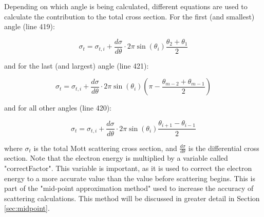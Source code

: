 \documentclass[10pt, reqno]{exam}
\begin{document}
Depending on which angle is being calculated, different equations are used to calculate the contribution to the total cross section. For the first (and smallest) angle (line 419): \par

\begin{equation}
    \sigma_{t} = \sigma_{t,i} + \frac{d\sigma}{d\theta}\cdot 2\pi \sin(\theta_i)\frac{\theta_2 + \theta_1}{2}
\end{equation}

and for the last (and largest) angle (line 421): \par

\begin{equation}
    \sigma_{t} = \sigma_{t,i} + \frac{d\sigma}{d\theta}\cdot 2\pi \sin(\theta_i)\left( \pi - \frac{\theta_{m-2} + \theta_{m-1}}{2}\right)
\end{equation}

and for all other angles (line 420): \par

\begin{equation}
    \sigma_{t} = \sigma_{t,i} + \frac{d\sigma}{d\theta}\cdot 2\pi \sin(\theta_i)\frac{\theta_{i+1} - \theta_{i-1}}{2}
\end{equation}

where $\sigma_{t}$ is the total Mott scattering cross section, and $\frac{d\sigma}{d\theta}$ is the differential cross section. Note that the electron energy is multiplied by a variable called "correctFactor". This variable is important, as it is used to correct the electron energy to a more accurate value than the value before scattering begins. This is part of the "mid-point approximation method" used to increase the accuracy of scattering calculations. This method will be discussed in greater detail in Section \ref{sec:midpoint}.
\end{document}
